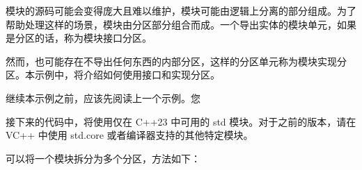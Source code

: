 
模块的源码可能会变得庞大且难以维护，模块可能由逻辑上分离的部分组成。为了帮助处理这样的场景，模块由分区部分组合而成。一个导出实体的模块单元，如果是分区的话，称为模块接口分区。

然而，也可能存在不导出任何东西的内部分区，这样的分区单元称为模块实现分区。本示例中，将介绍如何使用接口和实现分区。


继续本示例之前，应该先阅读上一个示例。您

\begin{myNotic}
接下来的代码中，将使用仅在 C++23 中可用的 std 模块。对于之前的版本，请在 VC++ 中使用 std.core 或者编译器支持的其他特定模块。
\end{myNotic}


可以将一个模块拆分为多个分区，方法如下：

